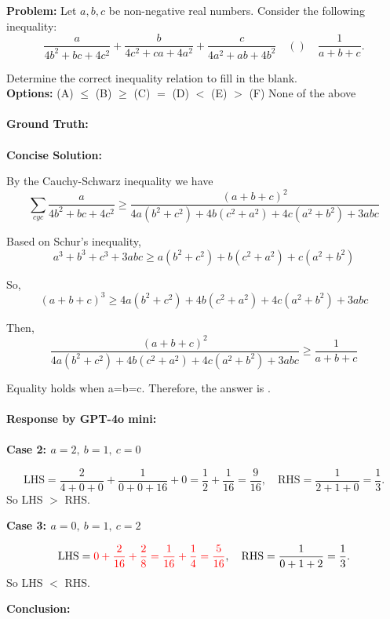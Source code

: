 \begin{examplebox}
\textbf{Problem:} Let $a, b, c$ be non-negative real numbers. Consider the following inequality:
$$
\frac{a}{4 b^{2}+b c+4 c^{2}}+\frac{b}{4 c^{2}+c a+4 a^{2}}+\frac{c}{4 a^{2}+a b+4 b^{2}} \quad () \quad \frac{1}{a+b+c} .
$$

Determine the correct inequality relation to fill in the blank.\\
\textbf{Options:} (A) $\leq$ \quad(B) $\geq$ \quad (C) $=$  \quad (D) $<$ \quad  (E) $>$  \quad (F) None of the above
\\\\
\textbf{Ground Truth:} 
\\\\
\textbf{Concise Solution:} 

By the Cauchy-Schwarz inequality we have
$$\sum_{cyc}\frac{a}{4 b^{2}+b c +4c^2} \geq \frac{(a+b+c)^{2}}{4 a\left(b^{2}+c^{2}\right)+4 b\left(c^{2}+a^{2}\right)+4 c\left(a^{2}+b^{2}\right)+3 a b c}$$

Based on Schur's inequality, $$a^{3}+b^{3}+c^{3}+3 a b c \geq a\left(b^{2}+c^{2}\right)+b\left(c^{2}+a^{2}\right)+c\left(a^{2}+b^{2}\right)$$

So,
$$(a+b+c)^{3} \geq 4 a\left(b^{2}+c^{2}\right)+4 b\left(c^{2}+a^{2}\right)+4 c\left(a^{2}+b^{2}\right)+3 a b c$$

Then,
$$\frac{(a+b+c)^{2}}{4 a\left(b^{2}+c^{2}\right)+4 b\left(c^{2}+a^{2}\right)+4 c\left(a^{2}+b^{2}\right)+3 a b c} \geq \frac{1}{a+b+c}$$

Equality holds when a=b=c. Therefore, the answer is .
\\\\
\textbf{Response by GPT-4o mini:}
\\\\
\textbf{Case 2: \( a = 2,\ b = 1,\ c = 0 \)}

\[
\text{LHS} = \frac{2}{4 + 0 + 0} + \frac{1}{0 + 0 + 16} + 0 = \frac{1}{2} + \frac{1}{16} = \frac{9}{16}, \quad
\text{RHS} = \frac{1}{2 + 1 + 0} = \frac{1}{3}.
\]
So LHS $>$ RHS.

\textbf{Case 3: \( a = 0,\ b = 1,\ c = 2 \)}

\[
\text{LHS} = {\textcolor{red}{0 + \frac{2}{16} + \frac{2}{8} = \frac{1}{16} + \frac{1}{4} = \frac{5}{16}}}, \quad
\text{RHS} = \frac{1}{0 + 1 + 2} = \frac{1}{3}.
\]
So LHS $<$ RHS.

\textbf{Conclusion:}


\end{examplebox}
